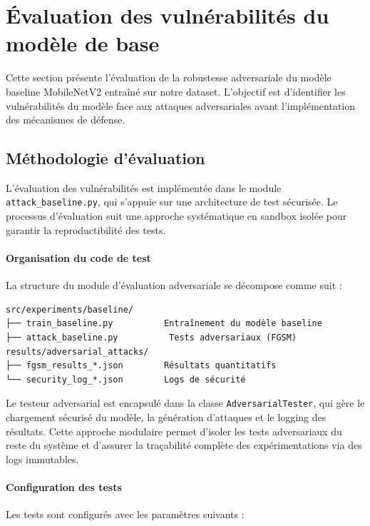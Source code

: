 \section{Évaluation des vulnérabilités du modèle de base}

Cette section présente l'évaluation de la robustesse adversariale du modèle baseline MobileNetV2 entraîné sur notre dataset. L'objectif est d'identifier les vulnérabilités du modèle face aux attaques adversariales avant l'implémentation des mécanismes de défense.

\subsection{Méthodologie d'évaluation}

L'évaluation des vulnérabilités est implémentée dans le module \texttt{attack\_baseline.py}, qui s'appuie sur une architecture de test sécurisée. Le processus d'évaluation suit une approche systématique en sandbox isolée pour garantir la reproductibilité des tests.

\paragraph{Organisation du code de test}

La structure du module d'évaluation adversariale se décompose comme suit :

\begin{verbatim}
src/experiments/baseline/
├── train_baseline.py          Entraînement du modèle baseline
├── attack_baseline.py          Tests adversariaux (FGSM)
results/adversarial_attacks/
├── fgsm_results_*.json        Résultats quantitatifs
└── security_log_*.json        Logs de sécurité
\end{verbatim}

Le testeur adversarial est encapsulé dans la classe \texttt{AdversarialTester}, qui gère le chargement sécurisé du modèle, la génération d'attaques et le logging des résultats. Cette approche modulaire permet d'isoler les tests adversariaux du reste du système et d'assurer la traçabilité complète des expérimentations via des logs immutables.

\paragraph{Configuration des tests}

Les tests sont configurés avec les paramètres suivants :

